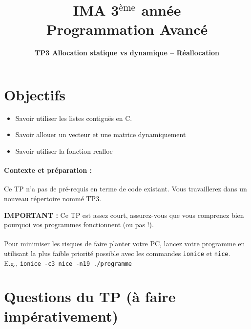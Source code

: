 \documentclass[final, pdftex, a4paper, openbib, ]{article}
\title{IMA 3$^{\mbox{\`eme}}$ année\\ Programmation Avancé
}
\author{\huge \textbf{TP3 Allocation statique vs dynamique -- Réallocation}}
\date{}
\begin{document}
\posttitle{\par\end{center}}
\setlength{\droptitle}{-45pt}
\maketitle

\vspace{-1.7cm}
\section{Objectifs}

\begin{itemize}
	\item Savoir utiliser les listes contiguës en C.
	\item Savoir allouer un vecteur et une matrice dynamiquement
	\item Savoir utiliser la fonction realloc
\end{itemize}


\paragraph{Contexte et préparation : } Ce TP n'a pas de pré-requis en terme de code existant. Vous travaillerez dans un nouveau répertoire nommé TP3.


\begin{alertinfo}{}
	\textbf{IMPORTANT :} Ce TP est assez court, assurez-vous que vous comprenez bien pourquoi vos programmes
	fonctionnent (ou pas !).\\ \\
	Pour minimiser les risques de faire planter votre PC, lancez votre programme en utilisant la plus faible priorité possible avec les commandes \texttt{ionice} et \texttt{nice}.\\
	E.g., \texttt{ionice -c3 nice -n19 ./programme}
\end{alertinfo}


\section{Questions du TP \large (à faire impérativement)}
\end{document}
